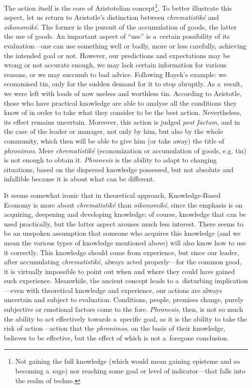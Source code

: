 The action itself is the core of Aristotelian concept\footnote{Not gaining the full knowledge (which would mean gaining episteme and so becoming a~sage) nor reaching some goal or level of indicator---that falls into the realm of techne.}. To better illustrate this aspect, let us return to Aristotle's distinction between \textit{chrematistiké} and \textit{oikonomiké}. The former is the pursuit of the accumulation of goods, the latter the use of goods. An important aspect of ``use'' is a~certain possibility of its evaluation---one can use something well or badly, more or less carefully, achieving the intended goal or not. However, our predictions and expectations may be wrong or not accurate enough, we may lack certain information for various reasons, or we may succumb to bad advice. Following Hayek's example: we economised tin, only for the sudden demand for it to stop abruptly. As a~result, we were left with loads of now useless and worthless tin. According to Aristotle, those who have practical knowledge are able to analyse all the conditions they know of in order to take what they consider to be the best action. Nevertheless, its effect remains uncertain. Moreover, this action is judged \textit{post factum}, and in the case of the leader or manager, not only by him, but also by the whole community, which then will be able to give him (or take away) the title of \textit{phronimos}. Mere \textit{chrematistiké} (economization or accumulation of goods, e.g. tin) is not enough to obtain it. \textit{Phronesis} is the ability to adapt to changing situations, based on the dispersed knowledge possessed, but not absolute and infallible because it is about what can be different.



It seems somewhat ironic that in theoretical approach, Knowledge-Based Economy is more about \textit{chrematistiké} than \textit{oikonomiké}, since the emphasis is on acquiring, deepening and developing knowledge; of course, knowledge that can be used practically, but the latter aspect arouses much less interest. There seems to be an unspoken assumption that someone who acquires this knowledge (and we mean the various types of knowledge mentioned above) will also know how to use it correctly. This knowledge should come from experience, but since our leader, after accumulating \textit{chrematistiké}, always acted properly---for the common good, it is virtually impossible to point out when and where they could have gained such experience. Meanwhile, the ancient concept leads to a~disturbing implication---even with theoretical knowledge and experience, our actions are always uncertain and subject to evaluation. Conditions, people, premises change, purely subjective or emotional factors come to the fore. \textit{Phronesis}, then, is not so much the ability to act effectively towards a~specific goal, as it is the ability to take the risk of action---action that the \textit{phronimos}, on the basis of their knowledge, believes to be effective, but the effect of which is not a~foregone conclusion.



